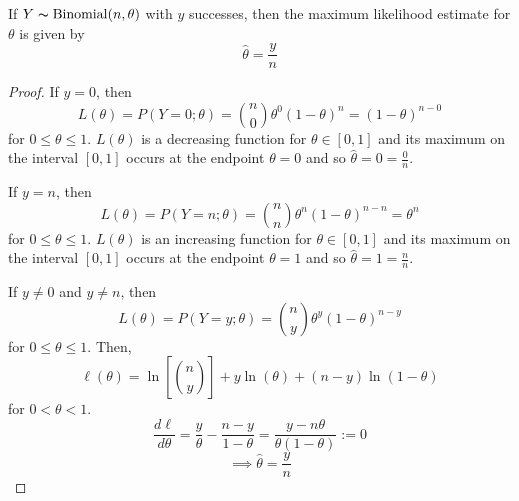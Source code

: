 \begin{thmbox}
    \begin{prop}
        If $ Y \thicksim \operatorname{Binomial}(n,\theta) $ with $ y $ successes, then the
        maximum likelihood estimate for $ \theta $ is given by
        \[ \hat{\theta}=\frac{y}{n} \]
    \end{prop}
\end{thmbox}
\begin{proof}
    If $ y=0 $, then
    \[ L(\theta)=P(Y=0;\theta)=\binom{n}{0}\theta^0(1-\theta)^n=(1-\theta)^{n-0} \]
    for $ 0\leqslant \theta \leqslant 1 $. $ L(\theta) $ is a decreasing function
    for $ \theta\in[0,1] $ and its maximum on the interval $ [0,1] $
    occurs at the endpoint $ \theta=0 $ and so $ \hat{\theta}=0=\frac{0}{n} $.
    
    If $ y=n $, then
    \[ L(\theta)=P(Y=n;\theta)=\binom{n}{n}\theta^n(1-\theta)^{n-n}=\theta^n \]
    for $ 0\leqslant \theta \leqslant 1 $. $ L(\theta) $ is an increasing function
    for $ \theta\in[0,1] $ and its maximum on the interval $ [0,1] $
    occurs at the endpoint $ \theta=1 $ and so $ \hat{\theta}=1=\frac{n}{n} $.
    
    If $ y\neq 0 $ and $ y\neq n $, then
    \[ L(\theta)=P(Y=y;\theta)=\binom{n}{y}\theta^y(1-\theta)^{n-y} \]
    for $ 0\leqslant \theta\leqslant 1 $. Then,
    \[ \ell(\theta)=\ln\left[ \binom{n}{y} \right]+y\ln(\theta)+(n-y)\ln(1-\theta) \]
    for $ 0<\theta<1 $.
    \[ \frac{d\ell}{d\theta}=\frac{y}{\theta}-\frac{n-y}{1-\theta}=\frac{y-n\theta}{\theta(1-\theta)}:=0  \]
    \[ \implies \hat{\theta}=\frac{y}{n} \]
\end{proof}

